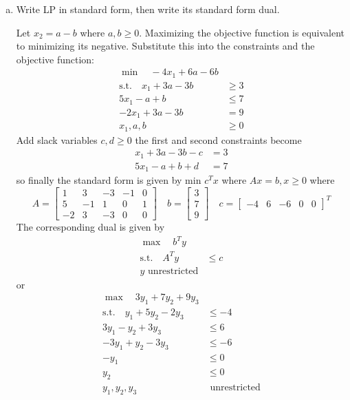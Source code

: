 \documentclass{article}
\begin{document}
\begin{enumerate}
		\begin{enumerate}[a)]
			\item Write LP in standard form, then write its standard form dual.
				\begin{soln}
					Let $x_2=a-b$ where $a, b\ge 0.$ Maximizing the objective function is equivalent to minimizing its negative. Substitute this into the constraints and the objective function:
					\begin{align*}
						\min\quad -4x_1+6a-6b & \\
						\text{s.t.}\quad x_1+3a-3b &\ge 3 \\
						5x_1-a+b &\le 7 \\
						-2x_1+3a-3b &= 9 \\
						x_1, a, b&\ge 0
					\end{align*}
					Add slack variables $c, d\ge 0$ the first and second constraints become
					\begin{align*}
						x_1+3a-3b-c &= 3 \\
						5x_1-a+b+d &= 7
					\end{align*} so finally the standard form is given by min $c^T x$ where $Ax=b, x\ge 0$ where \[A=\begin{bmatrix}
							1 & 3 & -3 & -1 & 0 \\
							5 & -1 & 1 & 0 & 1 \\
							-2 & 3 & -3 & 0 & 0
						\end{bmatrix}\quad b=\begin{bmatrix}
							3 \\ 7 \\ 9
						\end{bmatrix}\quad c=\begin{bmatrix}
							-4 & 6 & -6 & 0 & 0
					\end{bmatrix}^T\] The corresponding dual is given by
					\begin{align*}
						\max\quad b^T y & \\
						\text{s.t.}\quad A^T y &\le c \\
						y\text{ unrestricted}
					\end{align*} or 
					\begin{align*}
						\max\quad 3y_1+7y_2+9y_3 & \\
						\text{s.t.}\quad y_1+5y_2-2y_3 &\le -4 \\
						3y_1-y_2+3y_3 &\le 6 \\
						-3y_1+y_2-3y_3 &\le -6 \\
						-y_1 &\le 0 \\
						y_2 &\le 0 \\
						y_1, y_2, y_3&\text{ unrestricted}
					\end{align*}
				\end{soln}


\end{enumerate}
\end{enumerate}
\end{document}

